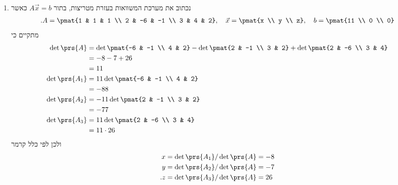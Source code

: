 \documentclass[a4paper,10pt,twoside,openany]{book}
\begin{document}
\begin{solution}
\begin{enumerate}
\item
נכתוב את מערכת המשוואות בעזרת מטריצות, בתור
$A\vec{x} = b$
כאשר
\begin{align*}
\text{.} A = \pmat{1 & 1 & 1 \\ 2 & -6 & -1 \\ 3 & 4 & 2}, \quad
\vec{x} = \pmat{x \\ y \\ z}, \quad
b = \pmat{11 \\ 0 \\ 0}
\end{align*}
מתקיים כי
\begin{align*}
\det\prs{A} &= \det\pmat{-6 & -1 \\ 4 & 2} - \det \pmat{2 & -1 \\ 3 & 2} + \det\pmat{2 & -6 \\ 3 & 4}
\\&= -8 -7 + 26
\\&= 11
\\
\det\prs{A_1} &= 11 \det\pmat{-6 & -1 \\ 4 & 2}
\\&= -88
\\
\det\prs{A_2} &= -11 \det \pmat{2 & -1 \\ 3 & 2}
\\&=
-77
\\
\det\prs{A_3} &= 11 \det\pmat{2 & -6 \\ 3 & 4}
\\&= 11 \cdot 26
\end{align*}
ולכן לפי כלל קרמר
\begin{align*}
x &= \det\prs{A_1} / \det\prs{A} = -8 \\
y &= \det\prs{A_2} / \det\prs{A} = -7 \\
\text{.} z &= \det\prs{A_3} / \det\prs{A} = 26
\end{align*}


\end{enumerate}
\end{solution}
\end{document}
